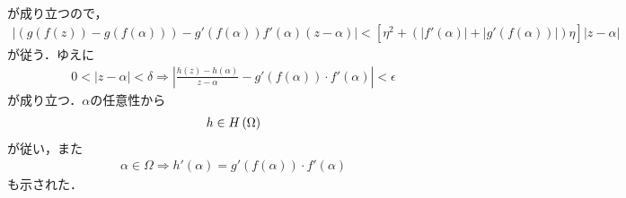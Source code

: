 \begin{sketch}
\begin{align}
		\end{align}
		が成り立つので，
		\begin{align}
			\left| \left(g(f(z)) - g(f(\alpha))\right) - g'(f(\alpha))f'(\alpha)(z-\alpha) \right|
			< \left[ \eta^2 + \left(|f'(\alpha)| + |g'(f(\alpha))| \right) \eta \right] |z-\alpha|
		\end{align}
		が従う．ゆえに
		\begin{align}
			0 < |z-\alpha| < \delta
			\Longrightarrow \left| \frac{h(z) - h(\alpha)}{z-\alpha} - g'(f(\alpha)) \cdot f'(\alpha) \right| < \epsilon
		\end{align}
		が成り立つ．$\alpha$の任意性から
		\begin{align}
			h \in H\left(\Omega\right)
		\end{align}
		が従い，また
		\begin{align}
			\alpha \in \Omega \Longrightarrow h'(\alpha) = g'(f(\alpha)) \cdot f'(\alpha)
		\end{align}
		も示された．
		\QED
	\end{sketch}
